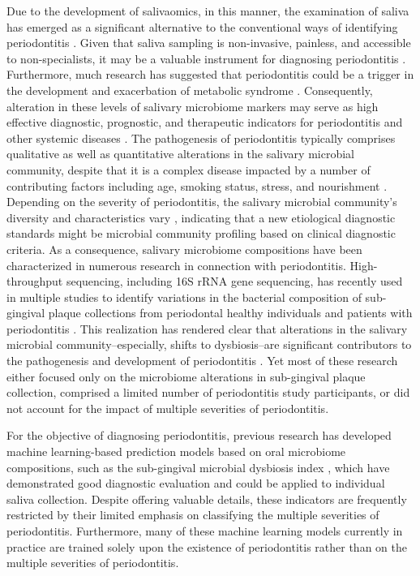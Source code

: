 \documentclass[11pt, a4paper, onecolumn, oneside]{report}
\begin{document}
            Due to the development of salivaomics, in this manner, the examination of saliva has emerged as a significant alternative to the conventional ways of identifying periodontitis \cite{Periodontitis-diagnosis-1, Periodontitis-diagnosis-2}. Given that saliva sampling is non-invasive, painless, and accessible to non-specialists, it may be a valuable instrument for diagnosing periodontitis \cite{Periodontitis-diagnosis-3}. Furthermore, much research has suggested that periodontitis could be a trigger in the development and exacerbation of metabolic syndrome \cite{Periodontitis-metabolic-1, Periodontitis-metabolic-2}. Consequently, alteration in these levels of salivary microbiome markers may serve as high effective diagnostic, prognostic, and therapeutic indicators for periodontitis and other systemic diseases \cite{Periodontitis-diagnosis-4, Periodontitis-diagnosis-5}. The pathogenesis of periodontitis typically comprises qualitative as well as quantitative alterations in the salivary microbial community, despite that it is a complex disease impacted by a number of contributing factors including age, smoking status, stress, and nourishment \cite{Periodontitis-7, Periodontitis-8}. Depending on the severity of periodontitis, the salivary microbial community's diversity and characteristics vary \cite{Periodontitis-7}, indicating that a new etiological diagnostic standards might be microbial community profiling based on clinical diagnostic criteria. As a consequence, salivary microbiome compositions have been characterized in numerous research in connection with periodontitis. High-throughput sequencing, including 16S rRNA gene sequencing, has recently used in multiple studies to identify variations in the bacterial composition of sub-gingival plaque collections from periodontal healthy individuals and patients with periodontitis \cite{Periodontitis-9, Periodontitis-10, Periodontitis-11}. This realization has rendered clear that alterations in the salivary microbial community--especially, shifts to dysbiosis--are significant contributors to the pathogenesis and development of periodontitis \cite{Periodontitis-12}. Yet most of these research either focused only on the microbiome alterations in sub-gingival plaque collection, comprised a limited number of periodontitis study participants, or did not account for the impact of multiple severities of periodontitis.

            For the objective of diagnosing periodontitis, previous research has developed machine learning-based prediction models based on oral microbiome compositions, such as the sub-gingival microbial dysbiosis index \cite{Periodontitis-diagnosis-6, Periodontitis-diagnosis-7}, which have demonstrated good diagnostic evaluation and could be applied to individual saliva collection. Despite offering valuable details, these indicators are frequently restricted by their limited emphasis on classifying the multiple severities of periodontitis. Furthermore, many of these machine learning models currently in practice are trained solely upon the existence of periodontitis rather than on the multiple severities of periodontitis.
\end{document}
